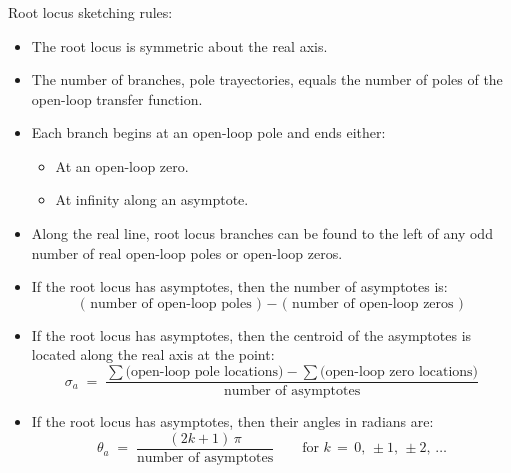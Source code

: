 \documentclass[ 10pt, xcolor = dvipsnames]{beamer}
\begin{document}
\begin{frame}[allowframebreaks]
\frametitle{\insertsection}

Root locus sketching rules:
\begin{itemize}
\item The root locus is symmetric about the real axis. 
\item The number of branches, \ie pole trayectories, equals the number of poles \linebreak of the open-loop transfer function. 
\item Each branch begins at an open-loop pole and ends either: 
\begin{itemize}
\item At an open-loop zero. 
\item At infinity along an asymptote. 
\end{itemize}
\item Along the real line, root locus branches can be found to the left of any \linebreak odd number of real open-loop poles or open-loop zeros. 
\framebreak

\item If the root locus has asymptotes, then the number of asymptotes is: 
\[
\text{ ( number of open-loop poles ) } -  
\text{ ( number of open-loop zeros ) }
\]
\item If the root locus has asymptotes, then the centroid of the asymptotes is located along the real axis at the point: 
\[
\sigma_a \; = \; 
\frac{ \sum \text{(open-loop pole locations)} - \sum \text{(open-loop zero locations)} }{ \text{number of asymptotes} }
\]
\item If the root locus has asymptotes, then their angles in radians are: 
\[
\theta_a \; = \; 
\frac{ ( 2k + 1 ) \, \pi }{ \text{number of asymptotes} }
\qquad
\text{for } k \, = \, 0, \, \pm 1, \, \pm 2, \, \dots
\]
\end{itemize}

\end{frame}

\end{document}
